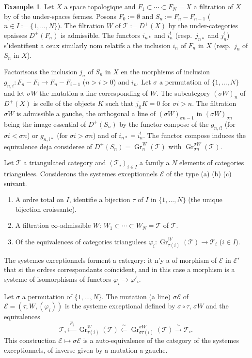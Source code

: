 \documentclass[11pt,a4paper]{article}
\theoremstyle{plain}
\theoremstyle{definition}
\newtheorem{example}[theorem]{Example}
\DeclareMathOperator{\Gr}{Gr}
\newcommand{\cT}{\mathscr{T}}
\newcommand{\cE}{\mathscr{E}}
\begin{document}
\begin{example}
Let $X$ a space topologique and $F_1 \subset \cdots \subset F_N = X$ a filtration of $X$ by of the under-spaces fermes. Posons $F_0 := \emptyset$ and $S_n := F_n - F_{n-1}$ ($n \in I := \{1,\ldots,N\}$). The filtration $W$ of $\cT := D^+(X)$ by the under-categories epaisses $D^+(F_n)$ is admissible. The functors $i_{n*}$ and $i_n^!$ (resp.\ $j_{n*}$ and $j_n^!$) s'identifient a ceux similarly nom relatifs a the inclusion $i_n$ of $F_n$ in $X$ (resp.\ $j_n$ of $S_n$ in $X$).

Factorisons the inclusion $j_n$ of $S_n$ in $X$ en the morphisms of inclusion $g_{n,i} : F_n - F_i \to F_n - F_{i-1}$ ($n > i > 0$) and $i_n$. Let $\sigma$ a permutation of $\{1,\ldots,N\}$ and let $\sigma W$ the mutation a line corresponding of $W$. The subcategory $(\sigma W)_n$ of $D^+(X)$ is celle of the objects $K$ such that $j_{i!} K = 0$ for $\sigma i > n$. The filtration $\sigma W$ is admissible a gauche, the orthogonal a line of $(\sigma W)_{\sigma n -1}$ in $(\sigma W)_{\sigma n}$ being the image essential of $D^+(S_n)$ by the functor compose of the $g_{n,i!}$ (for $\sigma i < \sigma n$) or $g_{n,i*}$ (for $\sigma i > \sigma n$) and of $i_{n*} = i_n^!$. The functor compose induces the equivalence deja consideree of $D^+(S_n) = \Gr_n^W(\cT)$ with $\Gr_{\sigma n}^{\sigma W}(\cT)$.
\end{example}

Let $\cT$ a triangulated category and $(\cT_i)_{i \in I}$ a family a $N$ elements of categories triangulees. Considerons the systemes exceptionnels $\cE$ of the type (a) (b) (c) suivant.
\begin{enumerate}[label=(\alph*)]
\item A ordre total on $I$, identifie a bijection $\tau$ of $I$ in $\{1,\ldots,N\}$ (the unique bijection croissante).
\item A filtration $\infty$-admissible $W$: $W_1 \subset \cdots \subset W_N = \cT$ of $\cT$.
\item Of the equivalences of categories triangulees $\varphi_i : \Gr_{\tau(i)}^W(\cT) \to \cT_i$ ($i \in I$).
\end{enumerate}
The systemes exceptionnels forment a category: it n'y a of morphism of $\cE$ in $\cE'$ that si the ordres correspondants co\"incident, and in this case a morphism is a systeme of isomorphisms of functors $\varphi_i \to \varphi'_i$.

Let $\sigma$ a permutation of $\{1,\ldots,N\}$. The mutation (a line) $\sigma \cE$ of $\cE = (\tau, W, (\varphi_i))$ is the systeme exceptional defined by $\sigma \circ \tau$, $\sigma W$ and the equivalences
\begin{equation}\label{eq:0.2b}
\cT_i \xleftarrow{\;\varphi_i\;} \Gr_{\tau(i)}^W(\cT) \xleftarrow{\;\sim\;} \Gr_{\sigma\tau(i)}^{\sigma W}(\cT) \xrightarrow{\;\sim\;} \cT_i.
\tag{0.2}
\end{equation}
This construction $\cE \mapsto \sigma \cE$ is a auto-equivalence of the category of the systemes exceptionnels, of inverse given by a mutation a gauche.
\end{document}
